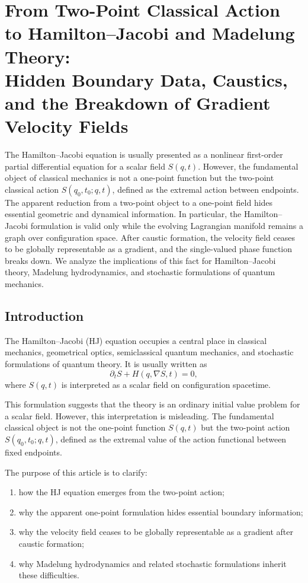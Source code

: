 \chapter{From Two-Point Classical Action to Hamilton--Jacobi and Madelung
Theory:\\ Hidden Boundary Data, Caustics, and the Breakdown of Gradient
Velocity Fields} The Hamilton--Jacobi equation is usually presented as a
nonlinear first-order partial differential equation for a scalar field
$S(q,t)$. However, the fundamental object of classical mechanics is not a
one-point function but the two-point classical action $S(q_0,t_0;q,t)$, defined
as the extremal action between endpoints. The apparent reduction from a
two-point object to a one-point field hides essential geometric and dynamical
information. In particular, the Hamilton--Jacobi formulation is valid only
while the evolving Lagrangian manifold remains a graph over configuration
space. After caustic formation, the velocity field ceases to be globally
representable as a gradient, and the single-valued phase function breaks down.
We analyze the implications of this fact for Hamilton--Jacobi theory, Madelung
hydrodynamics, and stochastic formulations of quantum mechanics.

\section{Introduction}

The Hamilton--Jacobi (HJ) equation occupies a central place in classical
mechanics, geometrical optics, semiclassical quantum mechanics, and stochastic
formulations of quantum theory. It is usually written as
\begin{equation}
\partial_t S + H(q,\nabla S,t)=0,
\label{HJ}
\end{equation}
where $S(q,t)$ is interpreted as a scalar field on configuration spacetime.

This formulation suggests that the theory is an ordinary initial value problem
for a scalar field. However, this interpretation is misleading. The fundamental
classical object is not the one-point function $S(q,t)$ but the two-point
action $S(q_0,t_0;q,t)$, defined as the extremal value of the action functional
between fixed endpoints.

The purpose of this article is to clarify:
\begin{enumerate}
\item how the HJ equation emerges from the two-point action;
\item why the apparent one-point formulation hides essential boundary
    information;
\item why the velocity field ceases to be globally representable as a gradient
    after caustic formation;
\item why Madelung hydrodynamics and related stochastic formulations inherit
    these difficulties.
\end{enumerate}

